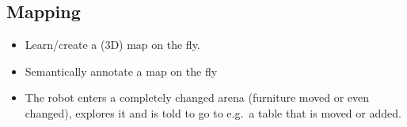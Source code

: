 \subsection{Mapping}
\begin{itemize}
	\item Learn/create a (3D) map on the fly.
	\item Semantically annotate a map on the fly
	\item The robot enters a completely changed arena (furniture moved or even changed),
	   explores it and is told to go to e.g.~a table that is moved or added.
\end{itemize}


